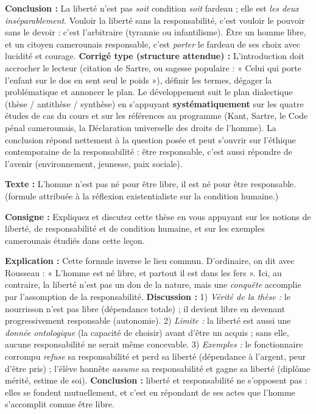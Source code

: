 \documentclass[11pt]{article}
\begin{document}
\begin{exoresolu}
\textbf{Conclusion :} La liberté n'est pas \emph{soit} condition \emph{soit} fardeau ; elle est \emph{les deux inséparablement}. Vouloir la liberté sans la responsabilité, c'est vouloir le pouvoir sans le devoir : c'est l'arbitraire (tyrannie ou infantilisme). Être un homme libre, et un citoyen camerounais responsable, c'est \emph{porter} le fardeau de ses choix avec lucidité et courage.
\tcblower
\textbf{Corrigé type (structure attendue) :}
L'introduction doit accrocher le lecteur (citation de Sartre, ou sagesse populaire : « Celui qui porte l'enfant sur le dos en sent seul le poids »), définir les termes, dégager la problématique et annoncer le plan. Le développement suit le plan dialectique (thèse / antithèse / synthèse) en s'appuyant \textbf{systématiquement} sur les quatre études de cas du cours et sur les références au programme (Kant, Sartre, le Code pénal camerounais, la Déclaration universelle des droits de l'homme). La conclusion répond nettement à la question posée et peut s'ouvrir sur l'éthique contemporaine de la responsabilité : être responsable, c'est aussi répondre de l'avenir (environnement, jeunesse, paix sociale).
\end{exoresolu}

\begin{exercice}
\textbf{Texte :} \og L'homme n'est pas né pour être libre, il est né pour être responsable. \fg{} (formule attribuée à la réflexion existentialiste sur la condition humaine.)

\textbf{Consigne :} Expliquez et discutez cette thèse en vous appuyant sur les notions de liberté, de responsabilité et de condition humaine, et sur les exemples camerounais étudiés dans cette leçon.
\end{exercice}

\begin{corrige}[Exercice n°1]
\textbf{Explication :} Cette formule inverse le lieu commun. D'ordinaire, on dit avec Rousseau : « L'homme est né libre, et partout il est dans les fers ». Ici, au contraire, la liberté n'est pas un don de la nature, mais une \emph{conquête} accomplie par l'assomption de la responsabilité. \textbf{Discussion :} 1) \emph{Vérité de la thèse :} le nourrisson n'est pas libre (dépendance totale) ; il devient libre en devenant progressivement responsable (autonomie). 2) \emph{Limite :} la liberté est aussi une \emph{donnée ontologique} (la capacité de choisir) avant d'être un acquis ; sans elle, aucune responsabilité ne serait même concevable. 3) \emph{Exemples :} le fonctionnaire corrompu \emph{refuse} sa responsabilité et perd sa liberté (dépendance à l'argent, peur d'être pris) ; l'élève honnête \emph{assume} sa responsabilité et gagne sa liberté (diplôme mérité, estime de soi). \textbf{Conclusion :} liberté et responsabilité ne s'opposent pas : elles se fondent mutuellement, et c'est en répondant de ses actes que l'homme s'accomplit comme être libre.
\end{corrige}
\end{document}
